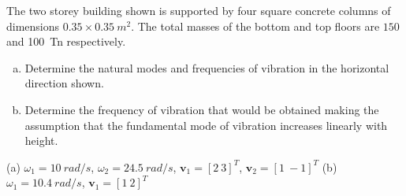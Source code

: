 
\begin{Exercise}[label={two_storey}]
The two storey building shown is supported by four square concrete columns of dimensions $0.35 \times \SI{0.35}{m^2}$. The total masses of the bottom and top floors are $150$ and \qty{100}{Tn} respectively.
\begin{enumerate}[(a)]
    \item Determine the natural modes and frequencies of vibration in the horizontal direction shown.
    \item Determine the frequency of vibration that would be obtained making the assumption that the fundamental mode of vibration increases linearly with height.
\end{enumerate}

\begin{center}
\end{center}

\shortAnswer (a) $\omega_1=\SI{10}{rad/s}$, $\omega_2=\SI{24.5}{rad/s}$, $\mathbf{v}_1 = [2\ 3]^T$, $\mathbf{v}_2 = [1\ {-}1]^T$
(b) $\omega_1=\SI{10.4}{rad/s}$, $\mathbf{v}_1 = [1\ 2]^T$
\end{Exercise}



